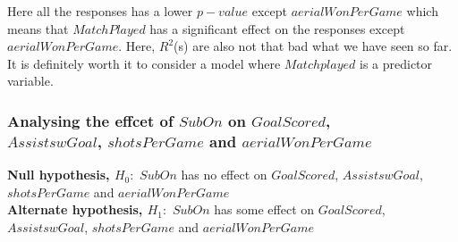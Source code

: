 \documentclass[12pt]{article}
\begin{document}
Here all the responses has a lower $ p-value $ except $ aerialWonPerGame $ which means that $ MatchPlayed $ has a significant effect on the responses except $ aerialWonPerGame $. Here, $ R^2 $(s) are also not that bad what we have seen so far. It is definitely worth it to consider a model where $ Matchplayed $ is a predictor variable.

\newpage

\subsubsection{Analysing the effcet of $ SubOn $ on $ GoalScored $, \\ $ AssistswGoal $, $ shotsPerGame $ and $ aerialWonPerGame $}

\textbf{Null hypothesis, $ H_0: $} $ SubOn $ has no effect on $ GoalScored $, $ AssistswGoal $, $ shotsPerGame $ and $ aerialWonPerGame $\\
\textbf{Alternate hypothesis, $ H_1: $} $ SubOn $ has some effect on $ GoalScored $, $ AssistswGoal $, $ shotsPerGame $ and $ aerialWonPerGame $
\end{document}

